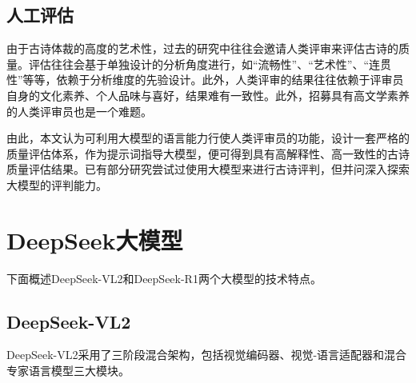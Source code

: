 \subsection{人工评估}

由于古诗体裁的高度的艺术性，过去的研究中往往会邀请人类评审来评估古诗的质量。评估往往会基于单独设计的分析角度进行，如“流畅性”、“艺术性”、“连贯性”等等，依赖于分析维度的先验设计。此外，人类评审的结果往往依赖于评审员自身的文化素养、个人品味与喜好，结果难有一致性。此外，招募具有高文学素养的人类评审员也是一个难题。

由此，本文认为可利用大模型的语言能力行使人类评审员的功能，设计一套严格的质量评估体系，作为提示词指导大模型，便可得到具有高解释性、高一致性的古诗质量评估结果。已有部分研究尝试过使用大模型来进行古诗评判，但并问深入探索大模型的评判能力。


\section{DeepSeek大模型}

下面概述DeepSeek-VL2和DeepSeek-R1两个大模型的技术特点。

\subsection{DeepSeek-VL2}

DeepSeek-VL2采用了三阶段混合架构，包括视觉编码器、视觉-语言适配器和混合专家语言模型三大模块。


